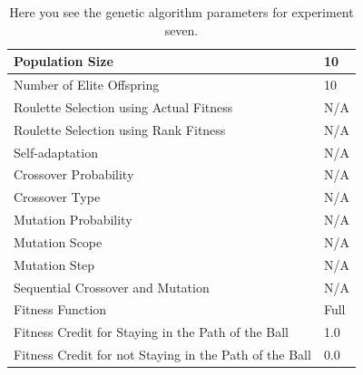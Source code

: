 \documentclass[a4paper,10pt]{article}
\begin{document}
\begin{table}[H]
\centering
\footnotesize
\begin{tabular}{ |>{\columncolor[gray]{0.8}} l | l| }
\hline
Population Size                                                      & 10                                                                       \\ \hline
Number of Elite Offspring                                            & 10                                                                       \\ \hline
Roulette Selection using Actual Fitness                              & N/A                                                                      \\ \hline
Roulette Selection using Rank Fitness                                & N/A                                                                      \\ \hline
Self-adaptation                                                      & N/A                                                                      \\ \hline
Crossover Probability                                                & N/A                                                                      \\ \hline
Crossover Type                                                       & N/A                                                                      \\ \hline
Mutation Probability                                                 & N/A                                                                      \\ \hline
Mutation Scope                                                       & N/A                                                                      \\ \hline
Mutation Step                                                        & N/A                                                                      \\ \hline
Sequential Crossover and Mutation                                    & N/A                                                       	              \\ \hline
Fitness Function                                                     & Full                                                                     \\ \hline
Fitness Credit for Staying in the Path of the Ball                   & 1.0                                                      	              \\ \hline
Fitness Credit for not Staying in the Path of the Ball               & 0.0                                                      	              \\ \hline
\end{tabular}
\caption{Here you see the genetic algorithm parameters for experiment seven.}
\label{tab:exp7}
\end{table}
\end{document}
